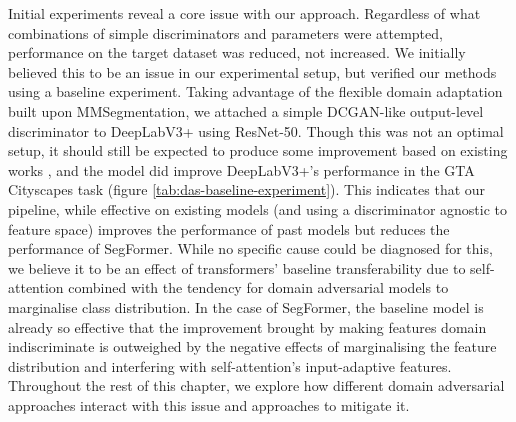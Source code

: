 \documentclass[a4paper,12pt]{report}
\begin{document}
Initial experiments reveal a core issue with our approach. Regardless of what combinations of simple discriminators and parameters were attempted, performance on the target dataset was reduced, not increased. We initially believed this to be an issue in our experimental setup, but verified our methods using a baseline experiment. Taking advantage of the flexible domain adaptation built upon MMSegmentation, we attached a simple DCGAN-like output-level discriminator to DeepLabV3+ using ResNet-50. Though this was not an optimal setup, it should still be expected to produce some improvement based on existing works \cite{tsai_learning_2020}, and the model did improve DeepLabV3+'s performance in the GTA \textrightarrow Cityscapes task (figure \ref{tab:das-baseline-experiment}). This indicates that our pipeline, while effective on existing models (and using a discriminator agnostic to feature space) improves the performance of past models but reduces the performance of SegFormer. While no specific cause could be diagnosed for this, we believe it to be an effect of transformers' baseline transferability due to self-attention \cite{dosovitskiy_image_2021} combined with the tendency for domain adversarial models to marginalise class distribution. In the case of SegFormer, the baseline model is already so effective that the improvement brought by making features domain indiscriminate is outweighed by the negative effects of marginalising the feature distribution and interfering with self-attention's input-adaptive features. Throughout the rest of this chapter, we explore how different domain adversarial approaches interact with this issue and approaches to mitigate it.

\begin{table}[]
    \caption{Baseline experiment results comparing SegFormer and DeeplabV3+. Both experiments used a simplified DCGAN-like \cite{radford_unsupervised_2016} discriminator consisting of 3 convolutional layers with 64, 128, and 2 channels respectively.}
    \label{tab:das-baseline-experiment}
\end{table}
\end{document}
